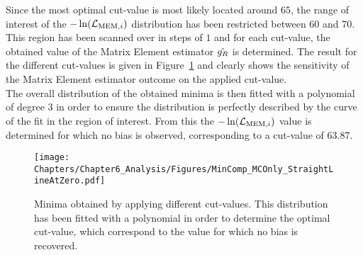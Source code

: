 Since the most optimal cut-value is most likely located around $65$, the range of interest of the $-\ln(\mathcal{L}_{\textrm{MEM}, i})$ distribution has been restricted between 60 and 70.
This region has been scanned over in steps of $1$ and for each cut-value, the obtained value of the Matrix Element estimator $\hat{g_{R}}$ is determined.  %
The result for the different cut-values is given in Figure~\ref{fig::CutValueFit} and clearly shows the sensitivity of the Matrix Element estimator outcome on the applied cut-value.
\\
The overall distribution of the obtained minima is then fitted with a polynomial of degree $3$ in order to ensure the distribution is perfectly described by the curve of the fit in the region of interest.
From this the $-\ln(\mathcal{L}_{\textrm{MEM}, i})$ value is determined for which no bias is observed, corresponding to a cut-value of $63.87$.
\\
\begin{figure}[h!t]
 \centering
 \texttt{[image: Chapters/Chapter6\_Analysis/Figures/MinComp\_MCOnly\_StraightLineAtZero.pdf]}  %
 \caption{Minima obtained by applying different cut-values. This distribution has been fitted with a polynomial in order to determine the optimal cut-value, which correspond to the value for which no bias is recovered.} \label{fig::CutValueFit}
\end{figure}


